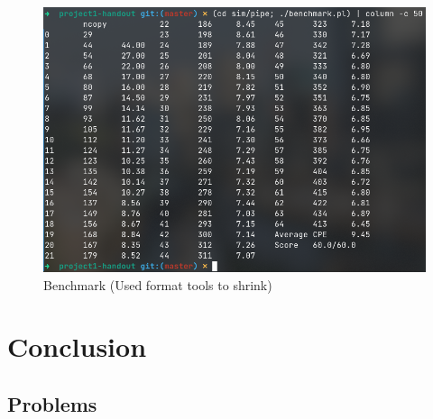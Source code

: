 \documentclass{article}
\begin{document}
\begin{figure} [H]
        \includegraphics[width=\textwidth]{fig-benchmark.png}
        \caption{Benchmark (Used format tools to shrink)}
\end{figure}

\section{Conclusion}

\subsection{Problems}
\end{document}
